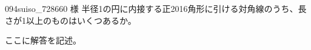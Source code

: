 \begin{prob}{094}{}{suiso\_728660 様}
 半径1の円に内接する正2016角形に引ける対角線のうち、長さが1以上のものはいくつあるか。
\end{prob}
ここに解答を記述。